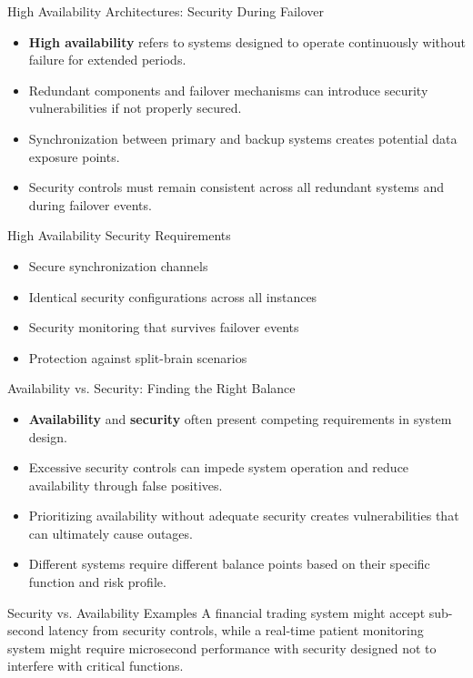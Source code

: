 \documentclass{beamer}
\begin{document}
    \begin{frame}{High Availability Architectures: Security During Failover}
    \begin{itemize}
    \item \textbf{High availability} refers to systems designed to operate continuously without failure for extended periods.
    \item Redundant components and failover mechanisms can introduce security vulnerabilities if not properly secured.
    \item Synchronization between primary and backup systems creates potential data exposure points.
    \item Security controls must remain consistent across all redundant systems and during failover events.
    \end{itemize}
    
    \begin{block}{High Availability Security Requirements}
    \begin{itemize}
    \item Secure synchronization channels
    \item Identical security configurations across all instances
    \item Security monitoring that survives failover events
    \item Protection against split-brain scenarios
    \end{itemize}
    \end{block}
    \end{frame}
    
    \begin{frame}{Availability vs. Security: Finding the Right Balance}
    \begin{itemize}
    \item \textbf{Availability} and \textbf{security} often present competing requirements in system design.
    \item Excessive security controls can impede system operation and reduce availability through false positives.
    \item Prioritizing availability without adequate security creates vulnerabilities that can ultimately cause outages.
    \item Different systems require different balance points based on their specific function and risk profile.
    \end{itemize}
    
    \begin{exampleblock}{Security vs. Availability Examples}
    A financial trading system might accept sub-second latency from security controls, while a real-time patient monitoring system might require microsecond performance with security designed not to interfere with critical functions.
    \end{exampleblock}
    \end{frame}
    
\end{document}
